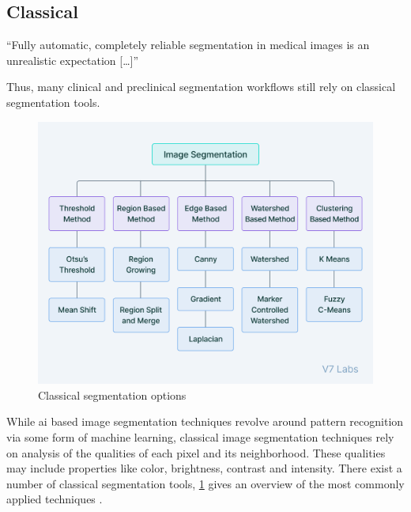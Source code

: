 \subsection{Classical}\label{s:b-seg-techniques}
\begin{displayquote}
	``Fully automatic, completely reliable segmentation in medical images is an unrealistic expectation [\ldots]''
\end{displayquote}
Thus, many clinical and preclinical segmentation workflows still rely on classical segmentation tools.
\begin{figure}[h]
	\centerline{
		\includegraphics[scale=0.5]{images/classicalSegTree.png}}
	\caption{Classical segmentation options \cite{v7labsIntroductionImageSegmentation2021}}\label{fig:classicalSegTree}
\end{figure}
\noindent
While \acrshort{ai} based image segmentation techniques revolve around pattern recognition
via some form of machine learning,
classical image segmentation techniques rely on analysis of the qualities of each pixel and its neighborhood.
These qualities may include properties like color, brightness, contrast and intensity.
There exist a number of classical segmentation tools,
\cref{fig:classicalSegTree} gives an overview of the most commonly applied techniques
\cite{yuTechniquesChallengesImage2023,baliReviewStrategiesTechniques2015}.

